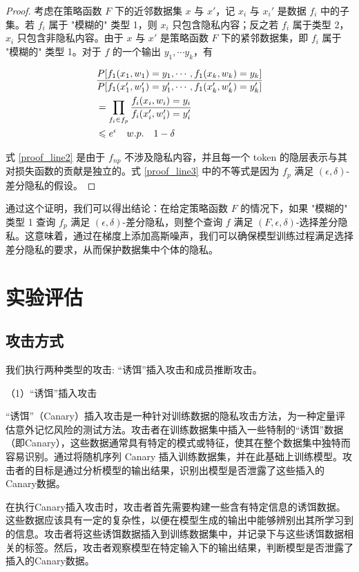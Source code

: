 \begin{proof}
	考虑在策略函数 $F$ 下的近邻数据集 $x$ 与 $x'$，记 $x_i$ 与 $x_i'$ 是数据 $f_i$ 中的子集。若 $f_i$ 属于 "模糊的" 类型 1，则 $x_i$ 只包含隐私内容；反之若 $f_i$ 属于类型 2，$x_i$ 只包含非隐私内容。由于 $x$ 与 $x'$ 是策略函数 $F$ 下的紧邻数据集，即 $f_i$ 属于 "模糊的" 类型 1。对于 $f$ 的一个输出 ${y_1,\cdots y_k}$，有

	\begin{align}
		&\frac{P[f_1(x_1,w_1)=y_1,\cdots,f_1(x_k,w_k)=y_k]}{P[f_1(x_1',w_1')=y_1',\cdots,f_1(x_k',w_k')=y_k']}\notag\\
		&=\prod_{f_i\in f_p}\frac{f_i(x_i,w_i)=y_i}{f_i(x_i',w_i')=y_i'} \label{proof_line2}\\
		&\leq e^\epsilon \quad w.p.\quad1-\delta \label{proof_line3}
	\end{align}
	
	式 \ref{proof_line2} 是由于 $f_{np}$ 不涉及隐私内容，并且每一个 token 的隐层表示与其对损失函数的贡献是独立的。式 \ref{proof_line3} 中的不等式是因为 $f_p$ 满足 $(\epsilon, \delta)$-差分隐私的假设。
\end{proof}

通过这个证明，我们可以得出结论：在给定策略函数 $F$ 的情况下，如果 "模糊的" 类型 1 查询 $f_p$ 满足 $(\epsilon, \delta)$-差分隐私，则整个查询 $f$ 满足 $(F, \epsilon, \delta)$-选择差分隐私。这意味着，通过在梯度上添加高斯噪声，我们可以确保模型训练过程满足选择差分隐私的要求，从而保护数据集中个体的隐私。

\section{实验评估}

\subsection{攻击方式}

我们执行两种类型的攻击: “诱饵”插入攻击和成员推断攻击。

（1）“诱饵”插入攻击\cite{canary}

“诱饵”（Canary）插入攻击是一种针对训练数据的隐私攻击方法，为一种定量评估意外记忆风险的测试方法。攻击者在训练数据集中插入一些特制的“诱饵”数据（即Canary），这些数据通常具有特定的模式或特征，使其在整个数据集中独特而容易识别。通过将随机序列 Canary 插入训练数据集，并在此基础上训练模型。攻击者的目标是通过分析模型的输出结果，识别出模型是否泄露了这些插入的Canary数据。

在执行Canary插入攻击时，攻击者首先需要构建一些含有特定信息的诱饵数据。这些数据应该具有一定的复杂性，以便在模型生成的输出中能够辨别出其所学习到的信息。攻击者将这些诱饵数据插入到训练数据集中，并记录下与这些诱饵数据相关的标签。然后，攻击者观察模型在特定输入下的输出结果，判断模型是否泄露了插入的Canary数据。

